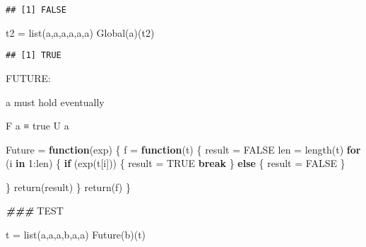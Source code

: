 \documentclass[
]{article}
\newenvironment{Shaded}{\begin{snugshade}}{\end{snugshade}}
\newcommand{\AlertTok}[1]{\textcolor[rgb]{0.94,0.16,0.16}{#1}}
\newcommand{\ConstantTok}[1]{\textcolor[rgb]{0.00,0.00,0.00}{#1}}
\newcommand{\ControlFlowTok}[1]{\textcolor[rgb]{0.13,0.29,0.53}{\textbf{#1}}}
\newcommand{\DecValTok}[1]{\textcolor[rgb]{0.00,0.00,0.81}{#1}}
\newcommand{\DocumentationTok}[1]{\textcolor[rgb]{0.56,0.35,0.01}{\textbf{\textit{#1}}}}
\newcommand{\FunctionTok}[1]{\textcolor[rgb]{0.00,0.00,0.00}{#1}}
\newcommand{\NormalTok}[1]{#1}
\newcommand{\OtherTok}[1]{\textcolor[rgb]{0.56,0.35,0.01}{#1}}
\newcommand{\SpecialCharTok}[1]{\textcolor[rgb]{0.00,0.00,0.00}{#1}}
\newcommand{\StringTok}[1]{\textcolor[rgb]{0.31,0.60,0.02}{#1}}
\begin{document}
\begin{verbatim}
## [1] FALSE
\end{verbatim}

\begin{Shaded}
\begin{Highlighting}[]
\NormalTok{t2 }\OtherTok{=} \FunctionTok{list}\NormalTok{(}\StringTok{\textquotesingle{}a\textquotesingle{}}\NormalTok{,}\StringTok{\textquotesingle{}a\textquotesingle{}}\NormalTok{,}\StringTok{\textquotesingle{}a\textquotesingle{}}\NormalTok{,}\StringTok{\textquotesingle{}a\textquotesingle{}}\NormalTok{,}\StringTok{\textquotesingle{}a\textquotesingle{}}\NormalTok{,}\StringTok{\textquotesingle{}a\textquotesingle{}}\NormalTok{)}
\FunctionTok{Global}\NormalTok{(a)(t2)}
\end{Highlighting}
\end{Shaded}

\begin{verbatim}
## [1] TRUE
\end{verbatim}

FUTURE:

a must hold eventually

F a ≡ true U a

\begin{Shaded}
\begin{Highlighting}[]
\NormalTok{Future }\OtherTok{=} \ControlFlowTok{function}\NormalTok{(exp) }
\NormalTok{\{}
\NormalTok{  f }\OtherTok{=} \ControlFlowTok{function}\NormalTok{(t)}
\NormalTok{  \{}
\NormalTok{    result }\OtherTok{=} \ConstantTok{FALSE}
\NormalTok{    len }\OtherTok{=} \FunctionTok{length}\NormalTok{(t)}
    \ControlFlowTok{for}\NormalTok{ (i }\ControlFlowTok{in} \DecValTok{1}\SpecialCharTok{:}\NormalTok{len)}
\NormalTok{    \{}
      \ControlFlowTok{if}\NormalTok{ (}\FunctionTok{exp}\NormalTok{(t[i]))}
\NormalTok{      \{}
\NormalTok{        result }\OtherTok{=} \ConstantTok{TRUE} 
        \ControlFlowTok{break}
\NormalTok{      \}}
      \ControlFlowTok{else}
\NormalTok{      \{}
\NormalTok{        result }\OtherTok{=} \ConstantTok{FALSE} 
\NormalTok{      \}}
      
\NormalTok{    \}}
    \FunctionTok{return}\NormalTok{(result)}
\NormalTok{  \}}
  \FunctionTok{return}\NormalTok{(f)}
\NormalTok{\}}

\DocumentationTok{\#\#\# }\AlertTok{TEST}\DocumentationTok{ }

\NormalTok{t }\OtherTok{=} \FunctionTok{list}\NormalTok{(}\StringTok{\textquotesingle{}a\textquotesingle{}}\NormalTok{,}\StringTok{\textquotesingle{}a\textquotesingle{}}\NormalTok{,}\StringTok{\textquotesingle{}a\textquotesingle{}}\NormalTok{,}\StringTok{\textquotesingle{}b\textquotesingle{}}\NormalTok{,}\StringTok{\textquotesingle{}a\textquotesingle{}}\NormalTok{,}\StringTok{\textquotesingle{}a\textquotesingle{}}\NormalTok{)}
\FunctionTok{Future}\NormalTok{(b)(t)}
\end{Highlighting}
\end{Shaded}
\end{document}
